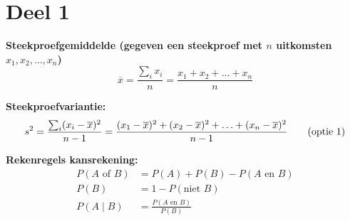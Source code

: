 \vspace{-1cm}
\section*{Deel 1}
\textbf{Steekproefgemiddelde (gegeven een steekproef met $n$ uitkomsten $x_1, x_2, \ldots, x_n$)}
\[
    \overline{x} = \frac{\sum_{i} x_i}{n} = \frac{x_1 + x_2 + \ldots + x_n}{n}
\]

\textbf{Steekproefvariantie:}
\begin{align*}
    s^2 &= \frac{\sum_{i} (x_i-\overline{x})^2}{n-1} = \frac{(x_1-\overline{x})^2 + (x_2-\overline{x})^2 + \ldots + (x_n - \overline{x})^2}{n-1} \hfill \tag{optie 1} \\%
\end{align*}

\textbf{Rekenregels kansrekening:}
\begin{align*}
    P(A \text{ of } B)      &= P(A) + P(B) - P(A \text{ en } B) \tag{optelregel}\\
    P(B)                    &= 1 - P(\text{niet } B) \tag{complementregel}\\
    P(A \mid B)         &= \frac{P(A \text{ en } B)}{P(B)} \tag{conditionele kansen}
\end{align*}

